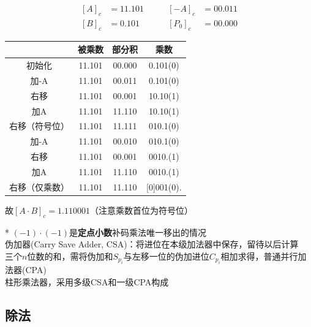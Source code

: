 \begin{analysis}
\[\begin{aligned}
[A]_c&=11.101 \qquad &[-A]_c&=00.011\\
[B]_c&=0.101 \qquad &[P_0]_c&=00.000
\end{aligned}\]
\begin{center}
\begin{tabular}{|c|c|c|c|}\hline
& 被乘数 & 部分积 & 乘数\\\hline
初始化 & 11.101 & 00.000 & 0.101(0)\\\hline
加-A & 11.101 & 00.011 & 0.101(0)\\\hline
右移 & 11.101 & 00.001 & 10.10(1)\\\hline
加A & 11.101 & 11.110 & 10.10(1)\\\hline
右移（符号位）& 11.101 & 11.111 & 010.1(0)\\\hline
加-A & 11.101 & 00.010 & 010.1(0)\\\hline
右移 & 11.101 & 00.001 & 0010.(1)\\\hline
加A & 11.101 & 11.110 & 0010.(1)\\\hline
右移（仅乘数） & 11.101 & 11.110 & [0]001(0).\\\hline
\end{tabular}
\end{center}
故$[A\cdot B]_c=1.110001$（注意乘数首位为符号位）
\end{analysis}
* $(-1)\cdot(-1)$是\textbf{定点小数}补码乘法唯一移出的情况\\
伪加器(Carry Save Adder, CSA)：将进位在本级加法器中保存，留待以后计算\\
三个$n$位数的和，需将伪加和$S_{p_i}$与左移一位的伪加进位$C_{p_i}$相加求得，普通并行加法器(CPA)\\
柱形乘法器，采用多级CSA和一级CPA构成

\subsection{除法}
